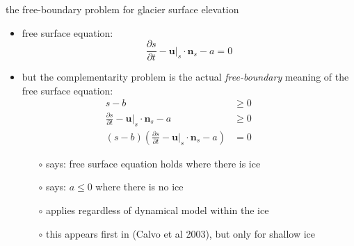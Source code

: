 \documentclass[10pt,svgnames]{beamer}
\newcommand{\bn}{\mathbf{n}}
\newcommand{\bu}{\mathbf{u}}
\begin{document}
\begin{frame}{the free-boundary problem for glacier surface elevation}

\begin{itemize}
\item free surface equation:
   $$\frac{\partial s}{\partial t} - \bu|_s \cdot \bn_s - a = 0$$
\item but the complementarity problem is the actual \emph{free-boundary} meaning of the free surface equation:
\begin{align*}
s - b &\ge 0 &&\phantom{x} \\
\frac{\partial s}{\partial t} - \bu|_s \cdot \bn_s - a &\ge 0 \\
(s - b) \left(\frac{\partial s}{\partial t} - \bu|_s \cdot \bn_s - a\right) &= 0
\end{align*}

    \begin{itemize}
    \item[$\circ$] says: free surface equation holds where there is ice
    \item[$\circ$] says: $a\le 0$ where there is no ice
    \item[$\circ$] applies regardless of dynamical model within the ice
    \item[$\circ$] this appears first in (Calvo et al 2003), but only for shallow ice
    \end{itemize}
\end{itemize}
\end{frame}
\end{document}
